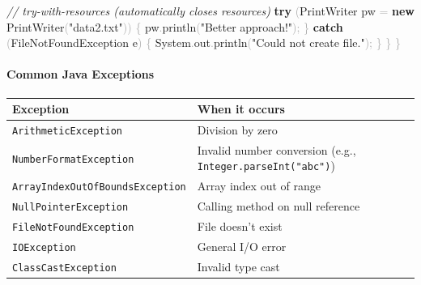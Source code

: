 \documentclass[
  justified,
  openright,
]{tufte-book}
\let\subsection\paragraph
\let\paragraph\paragraph
\newcommand{\KeywordTok}[1]{\textcolor{CodeKeyword}{\textbf{#1}}}  %
\newcommand{\StringTok}[1]{\textcolor{CodeString}{#1}}              %
\newcommand{\CommentTok}[1]{\textcolor{CodeComment}{\textit{#1}}}  %
\newcommand{\CodeFuncTok}[1]{\textcolor{CodeKeyword}{#1}}           %
\newcommand{\OperatorTok}[1]{\textcolor{DarkGray}{#1}}              %
\newenvironment{Shaded}{%
  \begin{mdframed}[style=TufteCode]%
}{%
  \end{mdframed}%
}
\let\subsection\paragraph
\let\paragraph\paragraph
\begin{document}
\begin{Shaded}
\begin{Highlighting}[]
        \CommentTok{// try{-}with{-}resources (automatically closes resources)}
        \KeywordTok{try} \OperatorTok{(}PrintWriter pw \OperatorTok{=} \KeywordTok{new} PrintWriter\OperatorTok{(}\StringTok{"data2.txt"}\OperatorTok{))} \OperatorTok{\{}
            pw\OperatorTok{.}\CodeFuncTok{println}\OperatorTok{(}\StringTok{"Better approach!"}\OperatorTok{);}
        \OperatorTok{\}} \KeywordTok{catch} \OperatorTok{(}FileNotFoundException e\OperatorTok{)} \OperatorTok{\{}
            System\OperatorTok{.}\CodeFuncTok{out}\OperatorTok{.}\CodeFuncTok{println}\OperatorTok{(}\StringTok{"Could not create file."}\OperatorTok{);}
        \OperatorTok{\}}
    \OperatorTok{\}}
\OperatorTok{\}}
\end{Highlighting}
\end{Shaded}

\subsection{Common Java Exceptions}\label{common-java-exceptions}

\begin{fullwidth}{\def\LTcaptype{none} %
\begin{longtable}[]{@{}
  >{\raggedright\arraybackslash}p{}
  >{\raggedright\arraybackslash}p{}@{}}
\toprule\noalign{}
\begin{minipage}[b]{\linewidth}\raggedright
Exception
\end{minipage} & \begin{minipage}[b]{\linewidth}\raggedright
When it occurs
\end{minipage} \\
\midrule\noalign{}
\endhead
\bottomrule\noalign{}
\endlastfoot
\texttt{ArithmeticException} & Division by zero \\
\texttt{NumberFormatException} & Invalid number conversion (e.g.,
\texttt{Integer.parseInt("abc")}) \\
\texttt{ArrayIndexOutOfBoundsException} & Array index out of range \\
\texttt{NullPointerException} & Calling method on null reference \\
\texttt{FileNotFoundException} & File doesn't exist \\
\texttt{IOException} & General I/O error \\
\texttt{ClassCastException} & Invalid type cast \\
\end{longtable}
}
\end{fullwidth}
\end{document}
